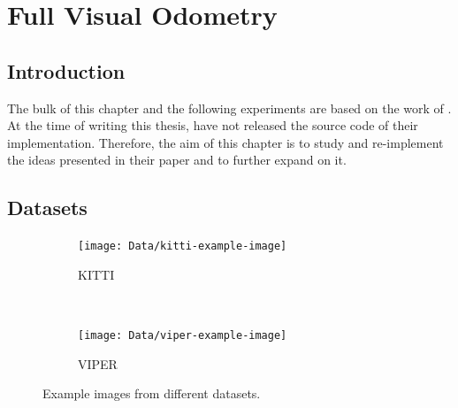 \chapter{Full Visual Odometry}

	\section{Introduction}
	The bulk of this chapter and the following experiments are based on the work of \cite{wang2017deepvo}.
	At the time of writing this thesis, \citeauthor{wang2017deepvo} have not released the source code of their implementation.
	Therefore, the aim of this chapter is to study and re-implement the ideas presented in their paper and to further expand on it.
	
	\section{Datasets}
		\begin{figure}
			\centering
			\begin{subfigure}[b]{0.8\linewidth}
				\centering
				\texttt{[image: Data/kitti-example-image]}
				\caption{
					KITTI
					\label{fig:kitti-example-image}
				}
			\end{subfigure}%
			\\
			\begin{subfigure}[b]{0.8\linewidth}
				\centering
				\texttt{[image: Data/viper-example-image]}
				\caption{
					VIPER
					\label{fig:viper-example-image}
				}
			\end{subfigure}%
			\caption[Example images from different datasets]
					{Example images from different datasets.
					 \label{fig:example-images-from-datasets}}
		\end{figure}
